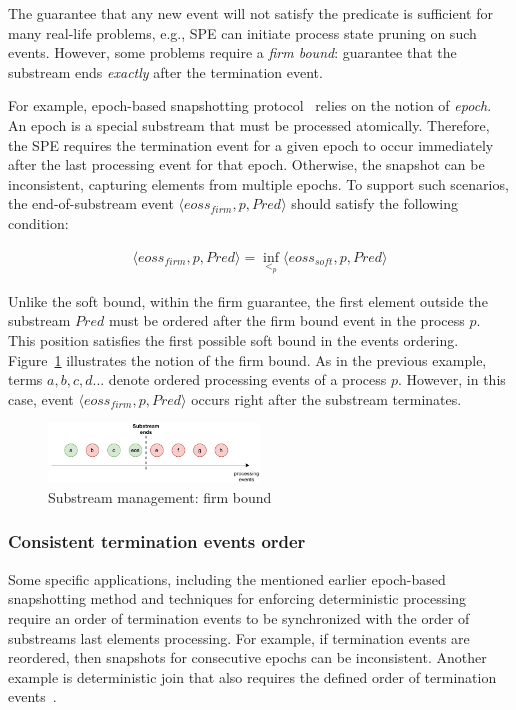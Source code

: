 The guarantee that any new event will not satisfy the predicate is sufficient for many real-life problems, e.g., SPE can initiate process state pruning on such events. However, some problems require a {\em firm bound}: guarantee that the substream ends {\em exactly} after the termination event. 

For example, epoch-based snapshotting protocol~\cite{2015arXiv150608603C, jacques2016consistent} relies on the notion of {\em epoch}. An epoch is a special substream that must be processed atomically. Therefore, the SPE requires the termination event for a given epoch to occur immediately after the last processing event for that epoch. Otherwise, the snapshot can be inconsistent, capturing elements from multiple epochs. To support such scenarios, the end-of-substream event $\langle eoss_{firm}, p, Pred\rangle$ should satisfy the following condition:

\begin{equation}\begin{array}{l}
\langle eoss_{firm}, p, Pred\rangle = \inf_{<_p} \langle eoss_{soft}, p, Pred\rangle
\end{array}\end{equation}

Unlike the soft bound, within the firm guarantee, the first element outside the substream $Pred$ must be ordered after the firm bound event in the process $p$. This position satisfies the first possible soft bound in the events ordering. Figure~\ref{strict_guarantees} illustrates the notion of the firm bound. As in the previous example, terms $a,b,c,d...$ denote ordered processing events of a process $p$. However, in this case, event $\langle eoss_{firm}, p, Pred\rangle$ occurs right after the substream terminates.

\begin{figure}[t]
  \centering
  \includegraphics[width=0.50\textwidth]{pics/strict-guarantee.pdf}
  \caption{Substream management: firm bound}
  \label{strict_guarantees}
\end{figure}

\subsubsection{Consistent termination events order}
Some specific applications, including the mentioned earlier epoch-based snapshotting method and techniques for enforcing deterministic processing~\cite{we2018adbis} require an order of termination events to be synchronized with the order of substreams last elements processing. For example, if termination events are reordered, then snapshots for consecutive epochs can be inconsistent. Another example is deterministic join that also requires the defined order of termination events~\cite{gulisano2016scalejoin}.

